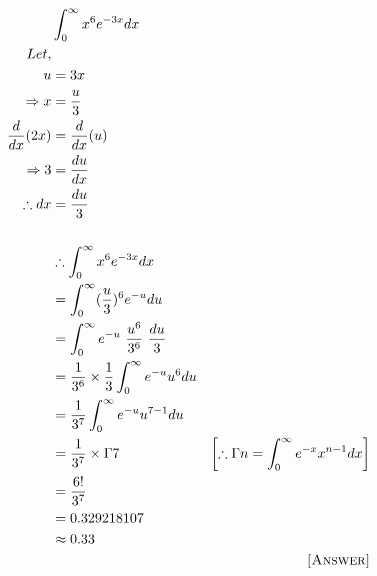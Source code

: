 \documentclass[12pt]{article}
\begin{document}
\begin{align*}
    &\int_{0}^{\infty}x^6 e^{-3x}dx\\
    Let,&\\
    u&=3x\\
    \Rightarrow x &=\frac{u}{3}\\
    \frac{d}{dx}(2x)&=\frac{d}{dx}(u)\\
    \Rightarrow 3 &= \frac{du}{dx}\\
    \therefore dx &= \frac{du}{3}
    \\\\
    & \therefore  \int_{0}^{\infty}x^6 e^{-3x}dx\\
    &= \int_{0}^{\infty} (\frac{u}{3})^6 e^{-u} du\\
    &= \int_{0}^{\infty} e^{-u} \ \frac{u^6}{3^6} \ \frac{du}{3}\\
    &= \frac{1}{3^6}\times \frac{1}{3} \int_{0}^{\infty} e^{-u} u^6 du\\
    &= \frac{1}{3^7} \int_{0}^{\infty}e^{-u} u^{7-1} du\\
    &= \frac{1}{3^7}\times \Gamma7 & \left[\therefore \Gamma n= \int_{0}^{\infty} e^{-x} x^{n-1}dx \right]\\
    &=\frac{6!}{3^7}\\
    &=0.329218107\\
    &\approx0.33\\
    & & \textsc{[Answer]}
\end{align*}
\end{document}
